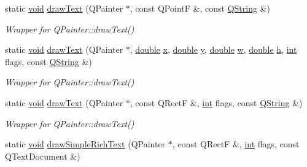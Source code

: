 \begin{DoxyCompactItemize}
static \hyperlink{group___u_a_v_objects_plugin_ga444cf2ff3f0ecbe028adce838d373f5c}{void} \hyperlink{class_qwt_painter_a60048491773b3eb7aac5b984a4bd9730}{draw\-Text} (Q\-Painter $\ast$, const Q\-Point\-F \&, const \hyperlink{group___u_a_v_objects_plugin_gab9d252f49c333c94a72f97ce3105a32d}{Q\-String} \&)
\begin{DoxyCompactList}\small\item\em Wrapper for Q\-Painter\-::draw\-Text() \end{DoxyCompactList}\item 
static \hyperlink{group___u_a_v_objects_plugin_ga444cf2ff3f0ecbe028adce838d373f5c}{void} \hyperlink{class_qwt_painter_a90fd62c3862e9f4543eda02279f75f10}{draw\-Text} (Q\-Painter $\ast$, \hyperlink{_super_l_u_support_8h_a8956b2b9f49bf918deed98379d159ca7}{double} \hyperlink{glext_8h_a1db9d104e3c2128177f26aff7b46982f}{x}, \hyperlink{_super_l_u_support_8h_a8956b2b9f49bf918deed98379d159ca7}{double} \hyperlink{glext_8h_a42315f3ed8fff752bb47fd782309fcfc}{y}, \hyperlink{_super_l_u_support_8h_a8956b2b9f49bf918deed98379d159ca7}{double} \hyperlink{glext_8h_ac1795f3b2fee217274b85c2750e1a889}{w}, \hyperlink{_super_l_u_support_8h_a8956b2b9f49bf918deed98379d159ca7}{double} \hyperlink{analyze_i_n_s_g_p_s_8m_afcefcf96b3c95673d4739bab1a16e58b}{h}, \hyperlink{ioapi_8h_a787fa3cf048117ba7123753c1e74fcd6}{int} flags, const \hyperlink{group___u_a_v_objects_plugin_gab9d252f49c333c94a72f97ce3105a32d}{Q\-String} \&)
\begin{DoxyCompactList}\small\item\em Wrapper for Q\-Painter\-::draw\-Text() \end{DoxyCompactList}\item 
static \hyperlink{group___u_a_v_objects_plugin_ga444cf2ff3f0ecbe028adce838d373f5c}{void} \hyperlink{class_qwt_painter_a2866de24c2d7ddb88ee5919d09cad03f}{draw\-Text} (Q\-Painter $\ast$, const Q\-Rect\-F \&, \hyperlink{ioapi_8h_a787fa3cf048117ba7123753c1e74fcd6}{int} flags, const \hyperlink{group___u_a_v_objects_plugin_gab9d252f49c333c94a72f97ce3105a32d}{Q\-String} \&)
\begin{DoxyCompactList}\small\item\em Wrapper for Q\-Painter\-::draw\-Text() \end{DoxyCompactList}\item 
static \hyperlink{group___u_a_v_objects_plugin_ga444cf2ff3f0ecbe028adce838d373f5c}{void} \hyperlink{class_qwt_painter_a1a44fdbb66452b38d57369a485da3971}{draw\-Simple\-Rich\-Text} (Q\-Painter $\ast$, const Q\-Rect\-F \&, \hyperlink{ioapi_8h_a787fa3cf048117ba7123753c1e74fcd6}{int} flags, const Q\-Text\-Document \&)

\end{DoxyCompactItemize}
